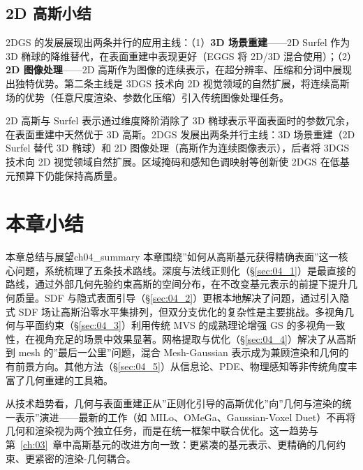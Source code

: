 \subsection{2D 高斯小结}

2DGS 的发展展现出两条并行的应用主线：（1）\textbf{3D 场景重建}——2D Surfel 作为 3D 椭球的降维替代，在表面重建中表现更好（EGGS 将 2D/3D 混合使用）；（2）\textbf{2D 图像处理}——2D 高斯作为图像的连续表示，在超分辨率、压缩和分词中展现出独特优势。第二条主线是 3DGS 技术向 2D 视觉领域的自然扩展，将连续高斯场的优势（任意尺度渲染、参数化压缩）引入传统图像处理任务。

\begin{takeaway}
2D 高斯与 Surfel 表示通过维度降阶消除了 3D 椭球表示平面表面时的参数冗余，在表面重建中天然优于 3D 高斯。2DGS 发展出两条并行主线：3D 场景重建（2D Surfel 替代 3D 椭球）和 2D 图像处理（高斯作为连续图像表示），后者将 3DGS 技术向 2D 视觉领域自然扩展。区域掩码和感知色调映射等创新使 2DGS 在低基元预算下仍能保持高质量。
\end{takeaway}




\section*{本章小结}

\begin{futurebox}{本章总结与展望}{ch04_summary}
本章围绕”如何从高斯基元获得精确表面”这一核心问题，系统梳理了五条技术路线。深度与法线正则化（\S\ref{sec:04_1}）是最直接的路线，通过外部几何先验约束高斯的空间分布，在不改变基元表示的前提下提升几何质量。SDF 与隐式表面引导（\S\ref{sec:04_2}）更根本地解决了问题，通过引入隐式 SDF 场让高斯沿零水平集排列，但双分支优化的复杂性是主要挑战。多视角几何与平面约束（\S\ref{sec:04_3}）利用传统 MVS 的成熟理论增强 GS 的多视角一致性，在视角充足的场景中效果显著。网格提取与优化（\S\ref{sec:04_4}）解决了从高斯到 mesh 的”最后一公里”问题，混合 Mesh-Gaussian 表示成为兼顾渲染和几何的有前景方向。其他方法（\S\ref{sec:04_5}）从信息论、PDE、物理感知等非传统角度丰富了几何重建的工具箱。

从技术趋势看，几何与表面重建正从”正则化引导的高斯优化”向”几何与渲染的统一表示”演进——最新的工作（如 MILo、OMeGa、Gaussian-Voxel Duet）不再将几何和渲染视为两个独立任务，而是在统一框架中联合优化。这一趋势与第~\ref{ch:03}~章中高斯基元的改进方向一致：更紧凑的基元表示、更精确的几何约束、更紧密的渲染-几何耦合。
\end{futurebox}
